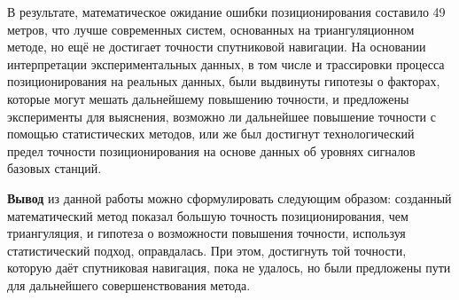 В результате, математическое ожидание ошибки позиционирования составило 49 метров, что лучше современных систем, основанных на триангуляционном методе, но ещё не достигает точности спутниковой навигации. На основании интерпретации экспериментальных данных, в том числе и трассировки процесса позиционирования на реальных данных, были выдвинуты гипотезы о факторах, которые могут мешать дальнейшему повышению точности, и предложены эксперименты для выяснения, возможно ли дальнейшее повышение точности с помощью статистических методов, или же был достигнут технологический предел точности позиционирования на основе данных об уровнях сигналов базовых станций.

{\bf{}Вывод} из данной работы можно сформулировать следующим образом: созданный математический метод показал большую точность позиционирования, чем триангуляция, и гипотеза о возможности повышения точности, используя статистический подход, оправдалась. При этом, достигнуть той точности, которую даёт спутниковая навигация, пока не удалось, но были предложены пути для дальнейшего совершенствования метода.
